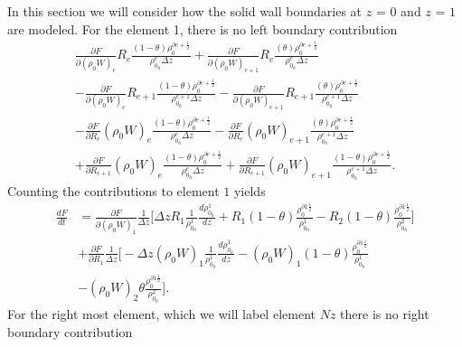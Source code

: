 \documentclass[a4paper,11pt]{article}
\begin{document}
In this section we will consider  how the solid wall boundaries at $z$ = 0 and $z$ = $1$ are modeled. For the element 1, there is no left boundary contribution
\begin{equation}
\begin{aligned}
\frac{\partial F}{\partial (\rho_0 W)_{e}}R_{e}\frac{(1-\theta)\rho_0^{\partial e +\frac{1}{2}}}{\rho_{0{{}_h}}^{e}\Delta z}+ \frac{\partial F}{\partial (\rho_0 W)_{e+1}}R_{e} \frac{(\theta)\rho_0^{\partial e +\frac{1}{2}}}{\rho_{0{{}_h}}^{e}\Delta z}\\ - \frac{\partial F}{\partial (\rho_0 W)_{e}}R_{e+1}\frac{(1-\theta)\rho_0^{\partial e +\frac{1}{2}}}{\rho_{0{{}_h}}^{e+1}\Delta z}  -\frac{\partial F}{\partial (\rho_0 W)_{e+1}}R_{e+1}\frac{(\theta)\rho_0^{\partial e +\frac{1}{2}}}{\rho_{0{{}_h}}^{e+1}\Delta z}\\
-\frac{\partial F}{\partial R_{e}}(\rho_0 W)_{e}\frac{(1-\theta)\rho_0^{\partial e +\frac{1}{2}}}{\rho_{0{{}_h}}^{e}\Delta z}  -\frac{\partial F}{\partial R_{e}}(\rho_0 W)_{e+1} \frac{(\theta)\rho_0^{\partial e +\frac{1}{2}}}{\rho_{0{{}_h}}^{e+1}\Delta z}\\+\frac{\partial F}{\partial R_{e+1}}(\rho_0 W)_{e}\frac{(1-\theta)\rho_0^{\partial e +\frac{1}{2}}}{\rho_{0{{}_h}}^{e}\Delta z}  +\frac{\partial F}{\partial R_{e+1}}(\rho_0 W)_{e+1} \frac{(1-\theta)\rho_0^{\partial e +\frac{1}{2}}}{\rho_{0{{}_h}}^{e+1}\Delta z}.
\end{aligned}
\end{equation}
Counting the contributions to element $1$ yields
\begin{equation}
\begin{aligned}
\frac{d F}{d t} &=\frac{\partial F}{\partial (\rho_0 W)_{1}}\frac{1}{\Delta z}\bigg [    \Delta z R_1 \frac{1}{\rho^1_{0{{}_h}}} \frac{d\rho^1_{0{{}_h}}}{dz}   + R_{1}(1-\theta)\frac{\rho_0^{\partial 1 \frac{1}{2}}}{\rho_{0{{}_h}}^{1}} - R_{2}(1-\theta)   \frac{\rho_0^{\partial 1  \frac{1}{2}}}{\rho_{0{{}_h}}^{2}}       \bigg]\\
&+\frac{\partial F}{\partial R_{1}}\frac{1}{\Delta z}\bigg [     - \Delta z (\rho_0 W)_1 \frac{1}{\rho^1_{0{{}_h}}} \frac{d\rho^1_{0{{}_h}}}{dz}   - (\rho_0 W)_{1}(1-\theta)\frac{\rho_0^{\partial 1 \frac{1}{2}}}{\rho_{0{{}_h}}^{1}}   \\ &- (\rho_0 W)_{2}\theta \frac{\rho_0^{\partial 1 \frac{1}{2}}}{\rho_{0{{}_h}}^{2}}     \bigg].
\end{aligned}
\end{equation}
For the right most element, which we will label element $Nz$ there is no right boundary contribution
\end{document}

